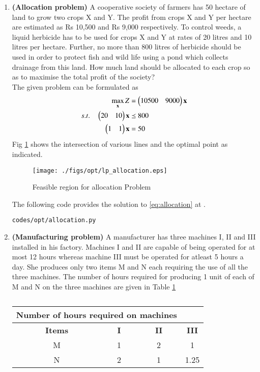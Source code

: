 \begin{enumerate}[label=\thesection.\arabic*.,ref=\thesection.\theenumi]
\item \textbf{(Allocation problem)} A cooperative society of farmers has 50 hectare
of land to grow two crops X and Y. The profit from crops X and Y per hectare are
estimated as Rs 10,500 and Rs 9,000 respectively. To control weeds, a liquid herbicide
has to be used for crops X and Y at rates of 20 litres and 10 litres per hectare. Further,
no more than 800 litres of herbicide should be used in order to protect fish and wild life
using a pond which collects drainage from this land. How much land should be allocated
to each crop so as to maximise the total profit of the society?\\
\solution The given problem can be formulated as
\begin{align}
\max_{\mathbf{x}} Z &= \begin{pmatrix}10500 & 9000\end{pmatrix}\mathbf{x}
\\
s.t. \quad 
\begin{pmatrix}
20 & 10
\end{pmatrix}
\mathbf{x} & \preceq 800
\\
\begin{pmatrix}
1 & 1
\end{pmatrix} 
\mathbf{x} &= 50
\label{eq:allocation}
\end{align}
Fig  \ref{fig:allocation}
shows the intersection of various lines and the optimal point as indicated.
\begin{figure}[h]
\texttt{[image: ./figs/opt/lp\_allocation.eps]}
\caption{Feasible region for allocation Problem}
\caption{}
\label{fig:allocation}
\end{figure}

The following code provides the solution to \eqref{eq:allocation} at .
%
\begin{lstlisting}
codes/opt/allocation.py
\end{lstlisting}

\item \textbf{(Manufacturing problem)} A manufacturer has three machines I, II
and III installed in his factory. Machines I and II are capable of being operated for
at most 12 hours whereas machine III must be operated for atleast 5 hours a day. She
produces only two items M and N each requiring the use of all the three machines.
The number of hours required for producing 1 unit of each of M and N on the three
machines are given in Table
	\ref{table:man-prob}
\begin{table}[!h]
	\centering
\begin{tabular}{|c|c|c|c|}
\hline
 \multicolumn{3}{|l}{\textbf{ Number of hours required on machines}}& \\ \cline{2-4}
\hline
\textbf {Items}&\textbf{I}&\textbf{II}&\textbf{III}\\
\hline
M&1&2&1\\
\hline
 N&2&1&1.25\\
 \hline 
\end{tabular}
	\caption{}
	\label{table:man-prob}
\end{table}



\end{enumerate}
